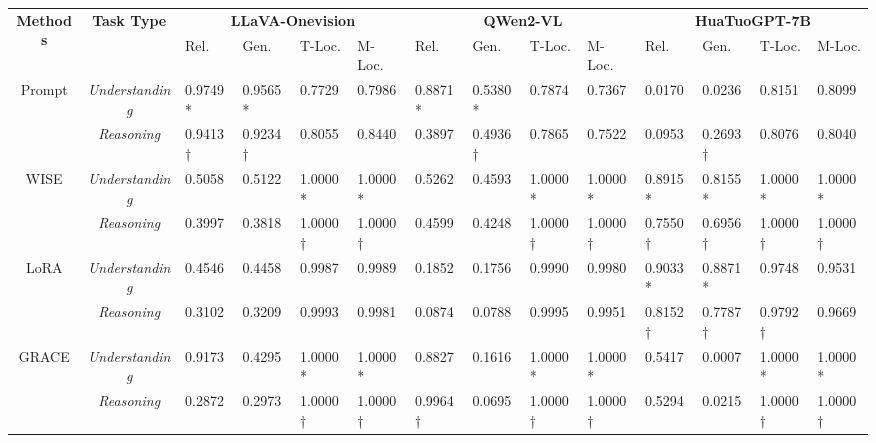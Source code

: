 \documentclass[letterpaper]{article} %
\begin{document}
\begin{table}[ht]

    \begin{center}
        \centering
        \small
        \setlength{\tabcolsep}{0.8mm}
        \begin{tabular}{cc *{12}{l}}
            \toprule[1.5pt]
            \multirow{2}{*}{\textbf{Methods}} & \multirow{2}{*}{\textbf{Task Type}} 
            & \multicolumn{4}{c}{\textbf{LLaVA-Onevision}} 
            & \multicolumn{4}{c}{\textbf{QWen2-VL}} 
            & \multicolumn{4}{c}{\textbf{HuaTuoGPT-7B}} \\
            \cmidrule(lr){3-6}
            \cmidrule(lr){7-10}
            \cmidrule(lr){11-14}
            & & Rel. & Gen. & T-Loc. & M-Loc. 
              & Rel. & Gen. & T-Loc. & M-Loc. 
              & Rel. & Gen. & T-Loc. & M-Loc. \\
            \midrule[0.5pt]

            \multirow{2}{*}{Prompt}
            & \textit{Understanding} & 0.9749* & 0.9565* & 0.7729 & 0.7986 & 0.8871* & 0.5380* & 0.7874 & 0.7367 & 0.0170 & 0.0236 & 0.8151 & 0.8099 \\
            & \textit{Reasoning}     & 0.9413† & 0.9234† & 0.8055 & 0.8440 & 0.3897 & 0.4936† & 0.7865 & 0.7522 & 0.0953 & 0.2693† & 0.8076 & 0.8040 \\
            \midrule[0.5pt]

            \multirow{2}{*}{WISE}
            & \textit{Understanding} & 0.5058 & 0.5122 & 1.0000* & 1.0000* & 0.5262 & 0.4593 & 1.0000* & 1.0000* & 0.8915* & 0.8155* & 1.0000* & 1.0000* \\
            & \textit{Reasoning}     & 0.3997 & 0.3818 & 1.0000† & 1.0000† & 0.4599 & 0.4248 & 1.0000† & 1.0000† & 0.7550† & 0.6956† & 1.0000† & 1.0000† \\
            \midrule[0.5pt]

            \multirow{2}{*}{LoRA}
            & \textit{Understanding} & 0.4546 & 0.4458 & 0.9987 & 0.9989 & 0.1852 & 0.1756 & 0.9990 & 0.9980 & 0.9033* & 0.8871* & 0.9748 & 0.9531 \\
            & \textit{Reasoning}     & 0.3102 & 0.3209 & 0.9993 & 0.9981 & 0.0874 & 0.0788 & 0.9995 & 0.9951 & 0.8152† & 0.7787† & 0.9792† & 0.9669 \\
            \midrule[0.5pt]

            \multirow{2}{*}{GRACE}
            & \textit{Understanding} & 0.9173 & 0.4295 & 1.0000* & 1.0000* & 0.8827 & 0.1616 & 1.0000* & 1.0000* & 0.5417 & 0.0007 & 1.0000* & 1.0000* \\
            & \textit{Reasoning}     & 0.2872 & 0.2973 & 1.0000† & 1.0000† & 0.9964† & 0.0695 & 1.0000† & 1.0000† & 0.5294 & 0.0215 & 1.0000† & 1.0000† \\
            \bottomrule[1.5pt]
        \end{tabular}
        

\end{center}
\end{table}
\end{document}
